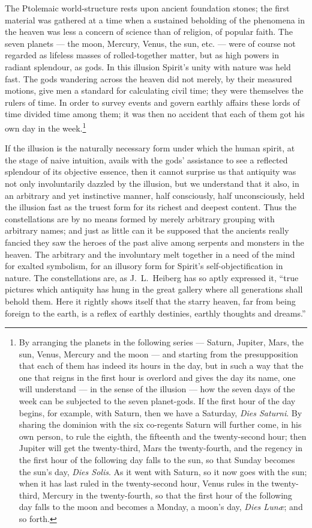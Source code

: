 \documentclass[12pt,a4paper]{book}
\begin{document}
The Ptolemaic world-structure rests upon ancient foundation stones; the first material was gathered at
a time when a sustained beholding of the phenomena in the heaven was less a concern of science than of
religion, of popular faith. The seven planets --- the moon, Mercury, Venus, the sun, etc. --- were of
course not regarded as lifeless masses of rolled-together matter, but as high powers in radiant
splendour, as gods. In this illusion Spirit's unity with nature was held fast. The gods wandering
across the heaven did not merely, by their measured motions, give men a standard for calculating civil
time; they were themselves the rulers of time. In order to survey events and govern earthly affairs
these lords of time divided time among them; it was then no accident that each of them got his own day
in the week.\footnote{%
By arranging the planets in the following series --- Saturn, Jupiter, Mars, the sun, Venus, Mercury and
the moon --- and starting from the presupposition that each of them has indeed its hours in the day,
but in such a way that the one that reigns in the first hour is overlord and gives the day its name,
one will understand --- in the sense of the illusion --- how the seven days of the week can be
subjected to the seven planet-gods. If the first hour of the day begins, for example, with Saturn, then
we have a Saturday, \textit{Dies Saturni}. By sharing the dominion with the six co-regents Saturn will
further come, in his own person, to rule the eighth, the fifteenth and the twenty-second hour; then
Jupiter will get the twenty-third, Mars the twenty-fourth, and the regency in the first hour of the
following day falls to the sun, so that Sunday becomes the sun's day, \textit{Dies Solis}. As it went
with Saturn, so it now goes with the sun; when it has last ruled in the twenty-second hour, Venus rules
in the twenty-third, Mercury in the twenty-fourth, so that the first hour of the following day falls to
the moon and becomes a Monday, a moon's day, \textit{Dies Lunæ}; and so forth.}

If the illusion is the naturally necessary form under which the human spirit, at the stage of naive
intuition, avails with the gods' assistance to see a reflected splendour of its objective essence, then
it cannot surprise us that antiquity was not only involuntarily dazzled by the illusion, but we
understand that it also, in an arbitrary and yet instinctive manner, half consciously, half
unconsciously, held the illusion fast as the truest form for its richest and deepest content. Thus the
constellations are by no means formed by merely arbitrary grouping with arbitrary names; and just as
little can it be supposed that the ancients really fancied they saw the heroes of the past alive among
serpents and monsters in the heaven. The arbitrary and the involuntary melt together in a need of the
mind for exalted symbolism, for an illusory form for Spirit's self-objectification in nature. The
constellations are, as J.\ L.\ Heiberg has so aptly expressed it, ``true pictures which antiquity has
hung in the great gallery where all generations shall behold them. Here it rightly shows itself that
the starry heaven, far from being foreign to the earth, is a reflex of earthly destinies, earthly
thoughts and dreams.''
\end{document}
